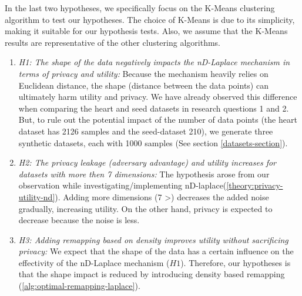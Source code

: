 \begin{enumerate}
          In the last two hypotheses, we specifically focus on the K-Means clustering algorithm to test our hypotheses.
          The choice of K-Means is due to its simplicity, making it suitable for our hypothesis tests.
          Also, we assume that the K-Means results are representative of the other clustering algorithms.
          \begin{enumerate}
              \item \textit{H1: The shape of the data negatively impacts the nD-Laplace mechanism in terms of privacy and utility:}
                    Because the mechanism heavily relies on Euclidean distance, the shape (distance between the data points) can ultimately harm utility and privacy.
                    We have already observed this difference when comparing the heart and seed datasets in research questions 1 and 2.
                    But, to rule out the potential impact of the number of data points (the heart dataset has 2126 samples and the seed-dataset 210), we generate three synthetic datasets, each with 1000 samples (See section \ref{datasets-section}).
              \item \textit{H2: The privacy leakage (adversary advantage) and utility increases for datasets with more then 7 dimensions:}
                    The hypothesis arose from our observation while investigating/implementing nD-laplace(\ref{theory:privacy-utility-nd}).
                    Adding more dimensions (7 >) decreases the added noise gradually, increasing utility.
                    On the other hand, privacy is expected to decrease because the noise is less.
              \item \textit{H3: Adding remapping based on density improves utility without sacrificing privacy:}
                    We expect that the shape of the data has a certain influence on the effectivity of the nD-Laplace mechanism ($H1$).
                    Therefore, our hypotheses is that the shape impact is reduced by introducing density based remapping (\ref{alg:optimal-remapping-laplace}).
          \end{enumerate}
\end{enumerate}
\newpage
